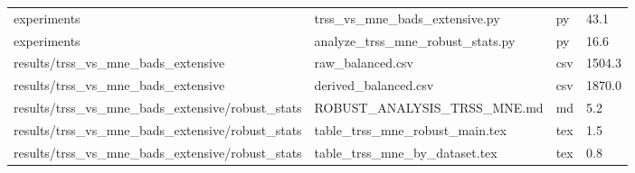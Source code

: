 \begin{landscape}
\begin{longtable}{p{}p{}p{}p{}}
experiments & trss\_vs\_mne\_bads\_extensive.py & py & 43.1 \\
experiments & analyze\_trss\_mne\_robust\_stats.py & py & 16.6 \\
results/trss\_vs\_mne\_bads\_extensive & raw\_balanced.csv & csv & 1504.3 \\
results/trss\_vs\_mne\_bads\_extensive & derived\_balanced.csv & csv & 1870.0 \\
results/trss\_vs\_mne\_bads\_extensive/robust\_stats & ROBUST\_ANALYSIS\_TRSS\_MNE.md & md & 5.2 \\
results/trss\_vs\_mne\_bads\_extensive/robust\_stats & table\_trss\_mne\_robust\_main.tex & tex & 1.5 \\
results/trss\_vs\_mne\_bads\_extensive/robust\_stats & table\_trss\_mne\_by\_dataset.tex & tex & 0.8 \\
\bottomrule
\end{longtable}
\normalsize
\end{landscape}
